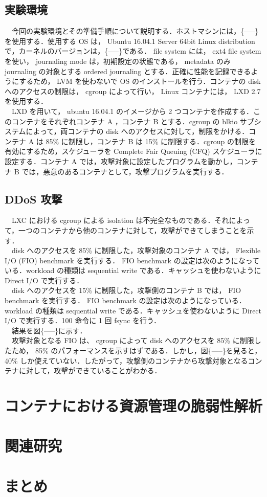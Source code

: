 \documentclass[graduation-thesis]{jsarticle}
\begin{document}
\subsection{実験環境}
　今回の実験環境とその準備手順について説明する．ホストマシンには，\{-----\}を使用する．使用する OS は， Ubuntu 16.04.1 Server 64bit Linux distribution で，カーネルのバージョンは，\{-----\}である． file system には， ext4 file system を使い， journaling mode は，初期設定の状態である， metadata のみ journaling の対象とする ordered journaling とする．正確に性能を記録できるようにするため， LVM を使わないで OS のインストールを行う．コンテナの disk へのアクセスの制限は， cgroup によって行い， Linux コンテナには， LXD 2.7 を使用する．\\
　LXD を用いて， ubuntu 16.04.1 のイメージから 2 つコンテナを作成する．このコンテナをそれぞれコンテナ A ，コンテナ B とする．cgroup の blkio サブシステムによって，両コンテナの disk へのアクセスに対して，制限をかける．コンテナ A は 85\% に制限し，コンテナ B は 15\% に制限する．cgroup の制限を有効にするため，スケジューラを Complete Fair Queuing (CFQ) スケジューラに設定する．コンテナ A では，攻撃対象に設定したプログラムを動かし，コンテナ B では，悪意のあるコンテナとして，攻撃プログラムを実行する．\\

\subsection{DDoS 攻撃}
　LXC における cgroup による isolation は不完全なものである．それによって，一つのコンテナから他のコンテナに対して，攻撃ができてしまうことを示す．\\
　disk へのアクセスを 85\% に制限した，攻撃対象のコンテナ A では， Flexible I/O (FIO) benchmark を実行する． FIO benchmark の設定は次のようになっている．workload の種類は sequential write である．キャッシュを使わないように Direct I/O で実行する．\\
　disk へのアクセスを 15\% に制限した，攻撃側のコンテナ B では， FIO benchmark を実行する． FIO benchmark の設定は次のようになっている． workload の種類は sequential write である．キャッシュを使わないように Direct I/O で実行する．100 命令に 1 回 fsync を行う．\\
　結果を図\{-----\}に示す．\\
　攻撃対象となる FIO は、 cgroup によって disk へのアクセスを 85\% に制限したため， 85\% のパフォーマンスを示すはずである．しかし，図\{-----\}を見ると， 40\% しか使えていない．したがって，攻撃側のコンテナから攻撃対象となるコンテナに対して，攻撃ができていることがわかる．

\clearpage
\section{コンテナにおける資源管理の脆弱性解析}
\label{sec:analysis}

\clearpage
\section{関連研究}
\label{sec:relative}

\clearpage
\section{まとめ}
\label{sec:conclusion}
\end{document}
